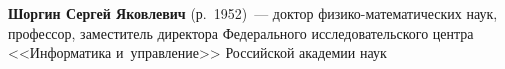 \begin{multicols}{2}
\vspace*{3pt}

\noindent
\textbf{Шоргин Сергей Яковлевич} (р.\ 1952)~---
 доктор фи\-зи\-ко-ма\-те\-ма\-ти\-че\-ских наук, профессор, заместитель директора 
 Федерального исследовательского цент\-ра <<Информатика и~управ\-ле\-ние>> 
 Российской академии наук


 \label{end\stat}






\end{multicols}

\newpage